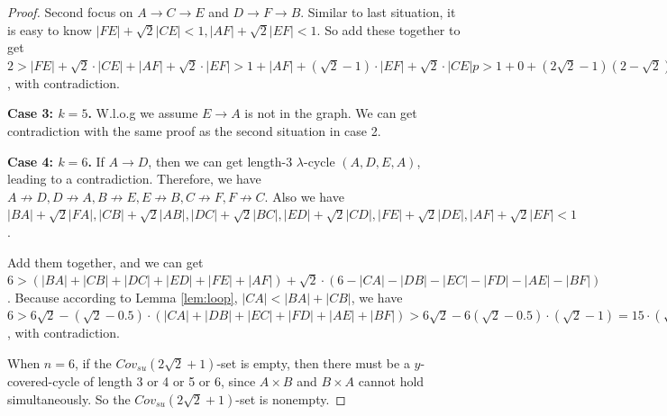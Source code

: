 \documentclass[11pt]{article}
\theoremstyle{remark}
\begin{document}
\begin{proof}
Second focus on $A\rightarrow C\rightarrow E$ and $D\rightarrow F\rightarrow B$.
Similar to last situation, it is easy to know $|FE|+\sqrt2|CE|<1, |AF|+\sqrt2|EF|<1$. So add these together to get $2>|FE|+\sqrt2\cdot|CE|+|AF|+\sqrt2\cdot|EF|>1+|AF|+(\sqrt2-1)\cdot|EF|+\sqrt2\cdot |CE|p> 1 + 0 + (2\sqrt2-1)(2-\sqrt2)=5\sqrt2-5>2$, with contradiction.

\noindent\textbf{Case 3: $k=5$.} W.l.o.g we assume $E\rightarrow A$ is not in the graph. We can get contradiction with the same proof as the second situation in case 2.

\noindent\textbf{Case 4: $k=6$.} If $A\rightarrow D$, then we can get length-3 $\lambda$-cycle $(A,D,E,A)$, leading to a contradiction. Therefore, we have $A\nrightarrow D,D\nrightarrow A,B\nrightarrow E,E\nrightarrow B,C\nrightarrow F,F\nrightarrow C$. Also we have
$|BA|+\sqrt2|FA|,|CB|+\sqrt2|AB|,|DC|+\sqrt2|BC|,|ED|+\sqrt2|CD|,|FE|+\sqrt2|DE|,|AF|+\sqrt2|EF|<1$.

Add them together, and we can get
$ 6 > (|BA|+|CB|+|DC|+|ED|+|FE|+|AF|) + \sqrt2\cdot (6-|CA|-|DB|-|EC|-|FD|-|AE|-|BF|) $.
Because according to Lemma \ref{lem:loop}, $|CA|<|BA|+|CB|$, we have
$6>6\sqrt2-(\sqrt2-0.5)\cdot (|CA|+|DB|+|EC|+|FD|+|AE|+|BF|)>6\sqrt2-6(\sqrt2-0.5)\cdot(\sqrt2-1)=15\cdot (\sqrt2-1)>6$, with contradiction.

When $n=6$, if the $Cov_{su}(2\sqrt2+1)$-set is empty, then there must be a $y$-covered-cycle of length 3 or 4 or 5 or 6, since  $A\times B$ and $B\times A$ cannot hold simultaneously. So the $Cov_{su}(2\sqrt2+1)$-set is nonempty.
\end{proof}
\end{document}
